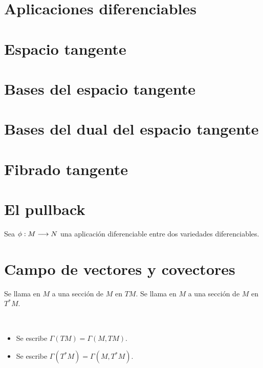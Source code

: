 \section{Aplicaciones diferenciables}\label{sec:aplicaciones-diferenciables}

\section{Espacio tangente}\label{sec:espacio-tangente}



\section{Bases del espacio tangente}\label{sec:bases-espacio-tangente}


\section{Bases del dual del espacio tangente}\label{sec:bases-dual-espacio-tangente}



\section{Fibrado tangente}\label{sec:fibrado-tangente}


\section{El pullback}\label{sec:pullback}
Sea $\phi:M\longrightarrow N$ una aplicación diferenciable entre dos variedades diferenciables.

\section{Campo de vectores y covectores}\label{sec:campo-vectores-covectores}
\begin{definition}
  Se llama  en $M$ a una sección de $M$ en $TM$.
  Se llama  en $M$ a una sección de $M$ en $T^* M$.
\end{definition}

\begin{notation}
  \
  \begin{itemize}
    \item Se escribe $\Gamma(TM) = \Gamma(M, TM)$.
    \item Se escribe $\Gamma(T^*M) = \Gamma(M, T^*M)$.
  \end{itemize}
\end{notation}

